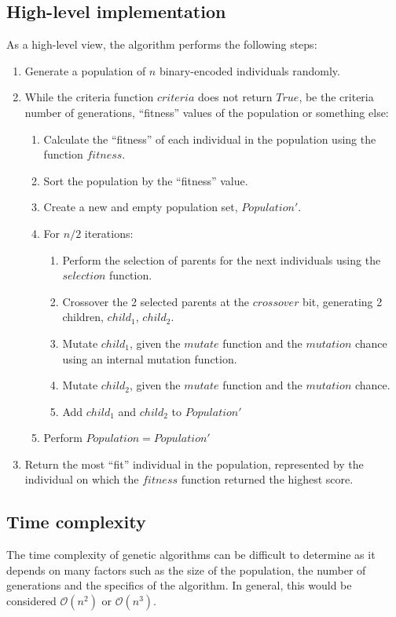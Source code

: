 \documentclass[conference]{IEEEtran}
\begin{document}
\subsection{High-level implementation}
As a high-level view, the algorithm performs the following steps:
\begin{enumerate}
    \item Generate a population of $n$ binary-encoded individuals randomly.
    \item While the criteria function $criteria$ does not return $True$, be the criteria number of generations, ``fitness'' values of the population or something else:
    \begin{enumerate}
        \item Calculate the ``fitness'' of each individual in the population using the function $fitness$.
        \item Sort the population by the ``fitness'' value.
        \item Create a new and empty population set, $Population'$.
        \item For $n / 2$ iterations:
        \begin{enumerate}
            \item Perform the selection of parents for the next individuals using the $selection$ function.
            \item Crossover the 2 selected parents at the $crossover$ bit, generating 2 children, $child_1$, $child_2$.
            \item Mutate $child_1$, given the $mutate$ function and the $mutation$ chance using an internal mutation function.
            \item Mutate $child_2$, given the $mutate$ function and the $mutation$ chance.
            \item Add $child_1$ and $child_2$ to $Population'$
        \end{enumerate}
        \item Perform $Population = Population'$
    \end{enumerate}
    \item Return the most ``fit'' individual in the population, represented by the individual on which the $fitness$ function returned the highest score.
\end{enumerate}

\subsection{Time complexity}
The time complexity of genetic algorithms can be difficult to determine as it depends on many factors such as the size of the population,
the number of generations and the specifics of the algorithm. In general, this would be considered $\mathcal{O}(n^2)$ or $\mathcal{O}(n^3)$.
\end{document}
